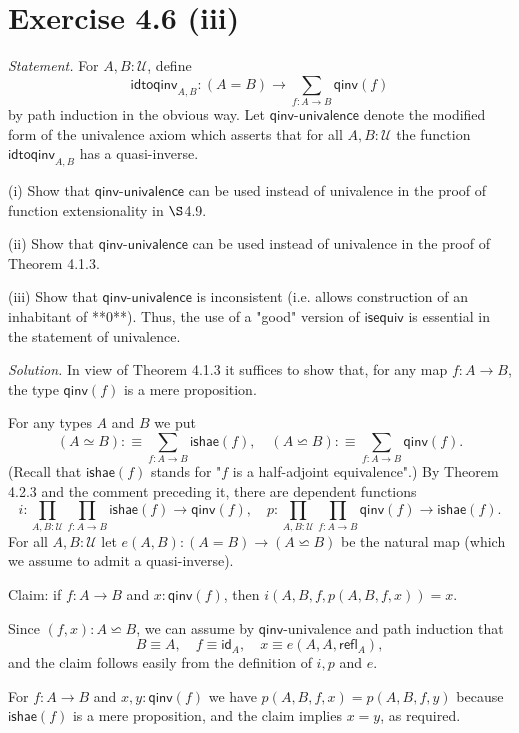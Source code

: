 \documentclass[12pt]{article}
\newcommand{\nn}{\noindent}
\begin{document}

\section{Exercise 4.6 (iii)}

\emph{Statement.} For $A,B:\mathcal U$, define
$$
\mathsf{idtoqinv}_{A,B}:(A=B)\to\sum_{f:A\to B}\mathsf{qinv}(f)
$$
by path induction in the obvious way. Let $\mathsf{qinv}$-$\mathsf{univalence}$ denote the modified form of the univalence axiom which asserts that for all $A,B:\mathcal U$ the function $\mathsf{idtoqinv}_{A,B}$ has a quasi-inverse.

\nn(i) Show that $\mathsf{qinv}$-$\mathsf{univalence}$ can be used instead of univalence in the proof of function extensionality in $\S$4.9.

\nn(ii) Show that $\mathsf{qinv}$-$\mathsf{univalence}$ can be used instead of univalence in the proof of Theorem 4.1.3.

\nn(iii) Show that $\mathsf{qinv}$-$\mathsf{univalence}$ is inconsistent (i.e. allows construction of an inhabitant of **0**). Thus, the use of a "good" version of $\mathsf{isequiv}$ is essential in the statement of univalence.

\nn\emph{Solution.} In view of Theorem 4.1.3 it suffices to show that, for any map $f:A\to B$, the type $\mathsf{qinv}(f)$ is a mere proposition. 

For any types $A$ and $B$ we put 
$$
(A\simeq B):\equiv\sum_{f:A\to B}\mathsf{ishae}(f),\quad(A\backsimeq B):\equiv\sum_{f:A\to B}\mathsf{qinv}(f).
$$ 
(Recall that $\mathsf{ishae}(f)$ stands for "$f$ is a half-adjoint equivalence".) By Theorem 4.2.3 and the comment preceding it, there are dependent functions 
$$
i:\prod_{A,B:\mathcal U}\prod_{f:A\to B}\mathsf{ishae}(f)\to\mathsf{qinv}(f),\quad p:\prod_{A,B:\mathcal U}\prod_{f:A\to B}\mathsf{qinv}(f)\to\mathsf{ishae}(f).
$$ 
For all $A,B:\mathcal U$ let $e(A,B):(A=B)\to(A\backsimeq B)$ be the natural map (which we assume to admit a quasi-inverse).

Claim: if $f:A\to B$ and $x:\mathsf{qinv}(f)$, then $i(A,B,f,p(A,B,f,x))=x$.
 
Since $(f,x):A\backsimeq B$, we can assume by $\mathsf{qinv}$-univalence and path induction that 
$$
B\equiv A,\quad f\equiv\mathsf{id}_A,\quad x\equiv e(A,A,\mathsf{refl}_A),
$$ 
and the claim follows easily from the definition of $i,p$ and $e$.

For $f:A\to B$ and $x,y:\mathsf{qinv}(f)$ we have $p(A,B,f,x)=p(A,B,f,y)$ because $\mathsf{ishae}(f)$ is a mere proposition, and the claim implies $x=y$, as required.
\end{document}
